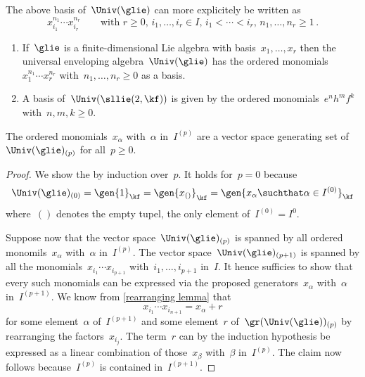\begin{remark}
	The above basis of~$\Univ(\glie)$ can more explicitely be written as
	\[
		x_{i_1}^{n_1} \dotsm x_{i_r}^{n_r}
		\qquad
		\text{with~$r \geq 0$,~$i_1, \dotsc, i_r \in I$,~$i_1 < \dotsb < i_r$,~$n_1, \dotsc, n_r \geq 1$} \,.
	\]
\end{remark}


\begin{example}
	\leavevmode
	\begin{enumerate}
		\item
			If~$\glie$ is a finite-dimensional Lie algebra with basis~$x_1, \dotsc, x_r$ then the universal enveloping algebra~$\Univ(\glie)$ has the ordered monomials~$x_1^{n_1} \dotsm x_r^{n_r}$ with~$n_1, \dotsc, n_r \geq 0$ as a basis.
		\item
			A basis of~$\Univ(\sllie(2, \kf))$ is given by the ordered monomials~$e^n h^m f^k$ with~$n, m, k \geq 0$.
	\end{enumerate}
\end{example}


\begin{lemma}
	\label{pbw concrete generating part filtered part}
	The ordered monomials~$x_\alpha$ with~$\alpha$ in~$I^{(p)}$ are a vector space generating set of~$\Univ(\glie)_{(p)}$ for all~$p \geq 0$.
\end{lemma}


\begin{proof}
	We show the  by induction over~$p$.
	It holds for~$p = 0$ because
	\[
		\Univ(\glie)_{(0)}
		=
		\gen{ 1 }_{\kf}
		=
		\gen{ x_{()} }_{\kf}
		=
		\gen{ x_\alpha \suchthat \alpha \in I^{(0)} }_{\kf}
	\]
	where~$()$ denotes the empty tupel, the only element of~$I^{(0)} = I^{0}$.
	
	Suppose now that the vector space~$\Univ(\glie)_{(p)}$ is spanned by all ordered monomils~$x_\alpha$ with~$\alpha$ in~$I^{(p)}$.
	The vector space~$\Univ(\glie)_{(p+1)}$ is spanned by all the monomials~$x_{i_1} \dotsm x_{i_{p+1}}$ with~$i_1, \dotsc, i_{p+1}$ in~$I$.
	It hence sufficies to show that every such monomials can be expressed via the proposed generators~$x_\alpha$ with~$\alpha$ in~$I^{(p+1)}$.
	We know from \cref{rearranging lemma} that
	\[
		x_{i_1} \dotsm x_{i_{n+1}}
		=
		x_\alpha + r
	\]
	for some element~$\alpha$ of~$I^{(p+1)}$ and some element~$r$ of~$\gr(\Univ(\glie))_{(p)}$ by rearranging the factors~$x_{i_j}$.
	The term~$r$ can by the induction hypothesis be expressed as a linear combination of those~$x_\beta$ with~$\beta$ in~$I^{(p)}$.
	The claim now follows because~$I^{(p)}$ is contained in~$I^{(p+1)}$.
\end{proof}


